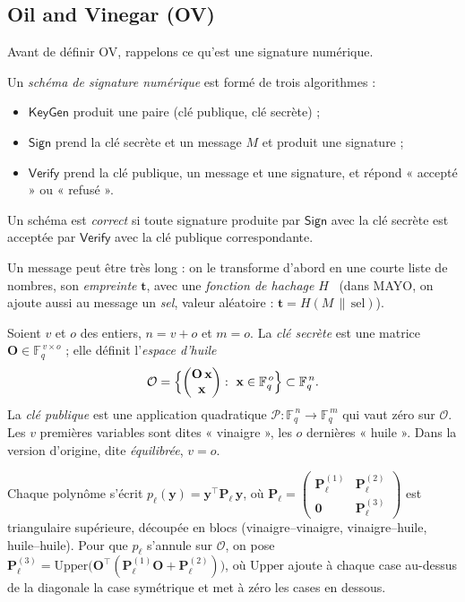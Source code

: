 \subsection{Oil and Vinegar (OV)}
Avant de définir OV, rappelons ce qu'est une signature numérique.
\begin{definition}
Un \emph{schéma de signature numérique} est formé de trois algorithmes :
\begin{itemize}[itemsep=1pt]
\item $\mathsf{KeyGen}$ produit une paire (clé publique, clé secrète) ;
\item $\mathsf{Sign}$ prend la clé secrète et un message $M$ et produit une signature ;
\item $\mathsf{Verify}$ prend la clé publique, un message et une signature, et répond « accepté » ou « refusé ».
\end{itemize}
Un schéma est \emph{correct} si toute signature produite par $\mathsf{Sign}$ avec la clé secrète est acceptée par $\mathsf{Verify}$ avec la clé publique correspondante.
\end{definition}
Un message peut être très long : on le transforme d'abord en une courte liste de nombres, son \emph{empreinte} $\mathbf{t}$, avec une \emph{fonction de hachage} $H$~\cite{hac} (dans MAYO, on ajoute aussi au message un \emph{sel}, valeur aléatoire : $\mathbf{t}=H(M\,\|\,\text{sel})$).

\begin{definition}
Soient $v$ et $o$ des entiers, $n=v+o$ et $m=o$. La \emph{clé secrète} est une matrice $\mathbf{O}\in\mathbb{F}_q^{\,v\times o}$ ; elle définit l'\emph{espace d'huile}
\[\mathcal{O}=\Bigl\{\begin{pmatrix}\mathbf{O}\,\mathbf{x}\\ \mathbf{x}\end{pmatrix}:\ \mathbf{x}\in\mathbb{F}_q^{\,o}\Bigr\}\subset\mathbb{F}_q^{\,n}.\]
La \emph{clé publique} est une application quadratique $\mathcal{P}:\mathbb{F}_q^{\,n}\to\mathbb{F}_q^{\,m}$ qui vaut zéro sur $\mathcal{O}$. Les $v$ premières variables sont dites « vinaigre », les $o$ dernières « huile ». Dans la version d'origine, dite \emph{équilibrée}, $v=o$.
\end{definition}
Chaque polynôme s'écrit $p_\ell(\mathbf{y})=\mathbf{y}^{\top}\mathbf{P}_\ell\,\mathbf{y}$, où $\mathbf{P}_\ell=\begin{pmatrix}\mathbf{P}^{(1)}_\ell&\mathbf{P}^{(2)}_\ell\\\mathbf{0}&\mathbf{P}^{(3)}_\ell\end{pmatrix}$ est triangulaire supérieure, découpée en blocs (vinaigre--vinaigre, vinaigre--huile, huile--huile). Pour que $p_\ell$ s'annule sur $\mathcal{O}$, on pose $\mathbf{P}^{(3)}_\ell=\mathrm{Upper}\bigl(\mathbf{O}^{\top}(\mathbf{P}^{(1)}_\ell\mathbf{O}+\mathbf{P}^{(2)}_\ell)\bigr)$, où $\mathrm{Upper}$ ajoute à chaque case au-dessus de la diagonale la case symétrique et met à zéro les cases en dessous.

